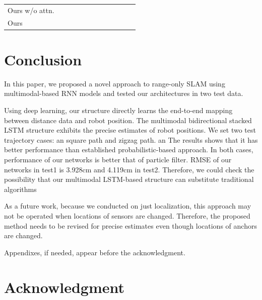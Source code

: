\documentclass{ieeeaccess}
\begin{document}
\begin{table}[t]
\begin{tabular}{llllllllllll}
		Ours w/o attn.          &                       &                       &                       &                           &                       &                       &                       &                           &                                           &                                                 &                                                 \\
		Ours                    &                       &                       &                       &                           &                       &                       &                       &                           &                                           &                                                 &                                                 \\
		\bottomrule
	\end{tabular}
\end{table}
\section{Conclusion}

In this paper, we proposed a novel approach to range-only SLAM using multimodal-based RNN models and tested our architectures in two test data.

Using deep learning, our structure directly learns the end-to-end mapping between distance data and robot position. The multimodal bidirectional stacked LSTM structure exhibits the precise estimates of robot positions. We set two test trajectory cases: an square path and zigzag path. an The results shows that it has better performance than established probabilistic-based approach. In both cases, performance of our networks  is better that of particle filter. RMSE of our networks in test1 is 3.928cm and 4.119cm in test2. Therefore, we could check the possibility that our multimodal LSTM-based structure can substitute traditional algorithms

As a future work, because we conducted on just localization, this approach may not be operated when locations of sensors are changed. Therefore, the proposed method needs to be revised for precise estimates even though locations of anchors are changed. 

\appendices

Appendixes, if needed, appear before the acknowledgment.

\section*{Acknowledgment}
\end{document}
